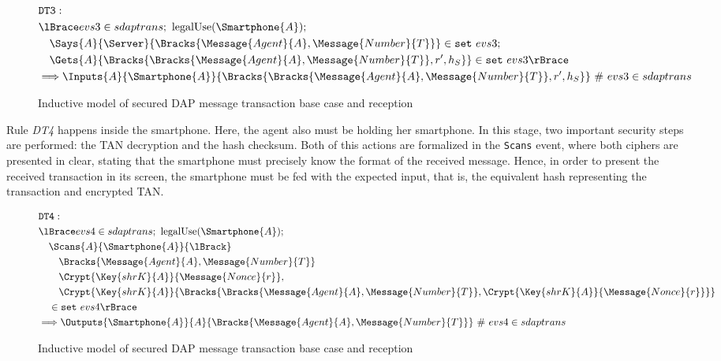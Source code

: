 \begin{figure}[h!]
  \begin{align*}
    & \texttt{DT3}: \newline \\
    & \lBrace evs3 \in sdaptrans;\ \text{legalUse}(\Smartphone{A}); \\
    & \quad \Says{A}{\Server}{\Bracks{\Message{Agent}{A}, \Message{Number}{T}}} \in \texttt{set} \ evs3; \\
    & \quad \Gets{A}{\Bracks{\Bracks{\Message{Agent}{A}, \Message{Number}{T}}, r', h_S}} \in \texttt{set} \ evs3 \rBrace \\
    & \Longrightarrow \Inputs{A}{\Smartphone{A}}{\Bracks{\Bracks{\Message{Agent}{A}, \Message{Number}{T}}, r', h_S}}   \ \# \ evs3 \in sdaptrans
  \end{align*}
  \label{fig:dap-model-2}
  \caption{Inductive model of secured DAP message transaction base case and reception}
\end{figure}

Rule \textit{DT4} happens inside the smartphone. Here, the agent also must be holding her smartphone. In this stage, two important security steps are performed: the TAN decryption and the hash checksum. Both of this actions are formalized in the \texttt{Scans} event, where both ciphers are presented in clear, stating that the smartphone must precisely know the format of the received message. Hence, in order to present the received transaction in its screen, the smartphone must be fed with the expected input, that is, the equivalent hash representing the transaction and encrypted TAN.

\begin{figure}[!h]
  \begin{align*}
    & \texttt{DT4}: \newline \\
    & \lBrace evs4 \in sdaptrans;\ \text{legalUse}(\Smartphone{A}); \\
    & \quad \Scans{A}{\Smartphone{A}}{\lBrack} \\
    & \qquad \Bracks{\Message{Agent}{A}, \Message{Number}{T}} \\
    & \qquad \Crypt{\Key{shrK}{A}}{\Message{Nonce}{r}}, \\
    & \qquad \Crypt{\Key{shrK}{A}}{\Bracks{\Bracks{\Message{Agent}{A}, \Message{Number}{T}}, \Crypt{\Key{shrK}{A}}{\Message{Nonce}{r}}}} \\
    & \quad \in \texttt{set} \ evs4 \rBrace \\
    & \Longrightarrow \Outputs{\Smartphone{A}}{A}{\Bracks{\Message{Agent}{A}, \Message{Number}{T}}} \ \# \ evs4 \in sdaptrans
  \end{align*}
  \label{fig:dap-model-2}
  \caption{Inductive model of secured DAP message transaction base case and reception}
\end{figure}

